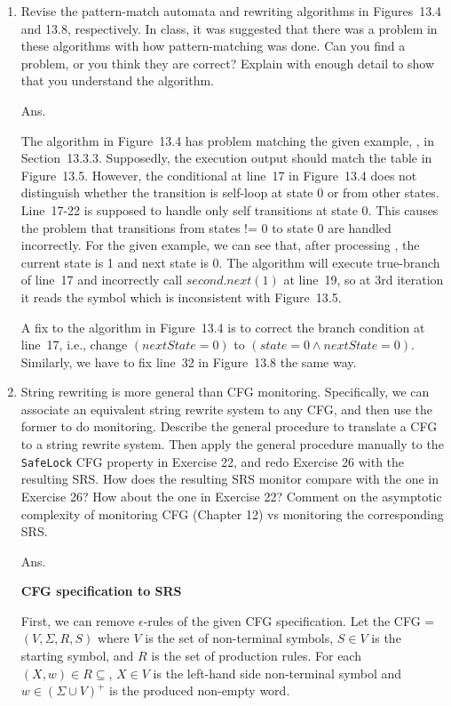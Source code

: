 \documentclass{article}
\begin{document}
\begin{enumerate}
\item Revise the pattern-match automata and rewriting algorithms in Figures~13.4
and 13.8, respectively.
In class, it was suggested that there was a problem in these algorithms with how
pattern-matching was done.
Can you find a problem, or you think they are correct?
Explain with enough detail to show that you understand the algorithm.

Ans.

The algorithm in Figure~13.4 has problem matching the given example,
\BEGIN \BEGIN \ACQ \BEGIN \END, in Section~13.3.3.
Supposedly, the execution output should match the table in Figure~13.5.
However, the conditional at line~17 in Figure~13.4 does not distinguish whether
the transition is self-loop at state 0 or from other states.
Line~17-22 is supposed to handle only self transitions at state 0.
This causes the problem that transitions from states != 0 to state 0 are handled
incorrectly.
For the given example, we can see that, after processing \BEGIN \BEGIN,
the current state is 1 and next state is 0.
The algorithm will execute true-branch of line~17 and incorrectly call
$second.next(1)$ at line~19,
so at 3rd iteration it reads the symbol \ACQ which is inconsistent with Figure~13.5.

A fix to the algorithm in Figure~13.4 is to correct the branch condition at line~17,
i.e., change $(nextState = 0)$ to $(state =0 \land nextState = 0)$.
Similarly, we have to fix line~32 in Figure~13.8 the same way.

\item String rewriting is more general than CFG monitoring.
Specifically, we can associate an equivalent string rewrite system to any CFG,
and then use the former to do monitoring. 
Describe the general procedure to translate a CFG to a string rewrite system.
Then apply the general procedure manually to the \texttt{SafeLock} CFG property
in Exercise 22,
and redo Exercise 26 with the resulting SRS.
How does the resulting SRS monitor compare with the one in Exercise 26?
How about the one in Exercise 22?
Comment on the asymptotic complexity of monitoring CFG (Chapter 12) vs monitoring
the corresponding SRS.

Ans.

\textbf{CFG specification to SRS}

First, we can remove $\epsilon$-rules of the given CFG specification.
Let the CFG = $(V, \Sigma, R, S)$ where $V$ is the set of non-terminal symbols,
$S \in V$ is the starting symbol, and $R$ is the set of production rules.
For each $(X, w) \in R \subseteq$, $X \in V$ is the left-hand side non-terminal symbol
and $w \in (\Sigma \cup V)^+$ is the produced non-empty word.


\end{enumerate}
\end{document}
